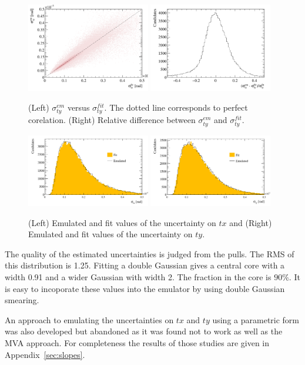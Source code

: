 \begin{figure}[h!]
\centering
\includegraphics[width=0.48\textwidth]{figs/corelation-ty.pdf}
\includegraphics[width=0.48\textwidth]{figs/difference-ty.pdf}
\caption{(Left)  $\sigma^{em}_{ty}$  versus  $\sigma^{fit}_{ty}$. The dotted line
  corresponds to perfect corelation. (Right) Relative difference
  between $\sigma^{em}_{ty}$  and  $\sigma^{fit}_{ty}$.}
\label{fig:corelty}
\end{figure}
%
\begin{figure}[h!]
\centering
\includegraphics[width=0.48\textwidth]{figs/etx.pdf}
\includegraphics[width=0.48\textwidth]{figs/ety.pdf}
\caption{(Left)  Emulated and fit values of the uncertainty on $tx$
  and (Right) Emulated and fit values of the uncertainty on $ty$. }
\label{fig:etxty}
\end{figure}
%

%
The quality of the estimated uncertainties is judged from the
pulls. The RMS of this
distribution is 1.25. Fitting a double
Gaussian gives a central core with a width 0.91 and a wider Gaussian
with width 2. The fraction in the core is $90 \%$. It is easy to
incoporate these values into the emulator by using double Gaussian
smearing.  

An approach to emulating the uncertainties on $tx$ and $ty$ using a
parametric form was also developed but abandoned as it was found not
to work as well as the MVA approach. For completeness the results of
those studies are given in Appendix~\ref{sec:slopes}.